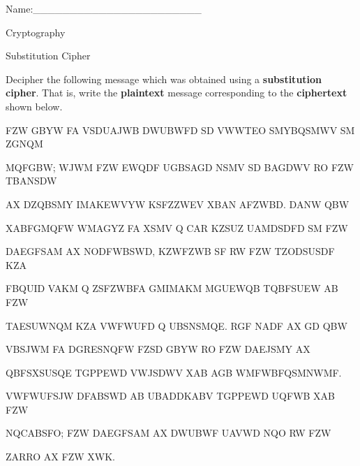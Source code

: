 \documentclass[12pt]{amsart}
\theoremstyle{definition}
\theoremstyle{remark}
\numberwithin{equation}{section}
\begin{document}
\begin{flushright}
Name:\_\_\_\_\_\_\_\_\_\_\_\_\_\_\_\_\_\_\_\_\_\_\_
\end{flushright}
\vspace{10pt}
\begin{center}
Cryptography

Substitution Cipher
\end{center}

\noindent Decipher the following message which was obtained using a {\bf substitution cipher}. That is, write the {\bf plaintext} message corresponding to the {\bf ciphertext} shown below.
\vspace{15pt}

\noindent
\vspace{15pt}
FZW GBYW FA VSDUAJWB DWUBWFD SD VWWTEO SMYBQSMWV SM ZGNQM 

\noindent
\vspace{15pt}
MQFGBW; WJWM FZW EWQDF UGBSAGD NSMV SD BAGDWV RO FZW TBANSDW 

\noindent
\vspace{15pt}
AX DZQBSMY IMAKEWVYW KSFZZWEV XBAN AFZWBD. DANW QBW

\noindent
\vspace{15pt}
XABFGMQFW WMAGYZ FA XSMV Q CAR KZSUZ UAMDSDFD SM FZW 

\noindent
\vspace{15pt}
DAEGFSAM AX NODFWBSWD, KZWFZWB SF RW FZW TZODSUSDF KZA
 
\noindent
\vspace{15pt}
FBQUID VAKM Q ZSFZWBFA GMIMAKM MGUEWQB TQBFSUEW AB FZW
 
\noindent
\vspace{15pt}
TAESUWNQM KZA VWFWUFD Q UBSNSMQE. RGF NADF AX GD QBW 

\noindent
\vspace{15pt}
VBSJWM FA DGRESNQFW FZSD GBYW RO FZW DAEJSMY AX 

\noindent
\vspace{15pt}
QBFSXSUSQE TGPPEWD VWJSDWV XAB AGB WMFWBFQSMNWMF. 

\noindent
\vspace{15pt}
VWFWUFSJW DFABSWD AB UBADDKABV TGPPEWD UQFWB XAB FZW 

\noindent
\vspace{15pt}
NQCABSFO; FZW DAEGFSAM AX DWUBWF UAVWD NQO RW FZW 

\noindent
\vspace{15pt}
ZARRO AX FZW XWK.
\end{document}
